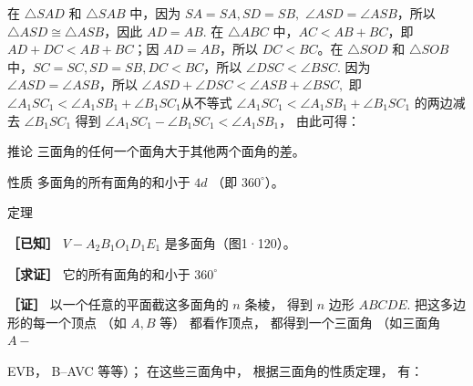 在 \(\triangle SAD\) 和 \(\triangle SAB\) 中，因为 \(SA = SA, SD = SB,\)
\(\angle ASD = \angle ASB\)，所以
\(\triangle ASD \cong \triangle ASB\)，因此 \(AD = AB.\) 在
\(\triangle ABC\) 中，\(AC < AB + BC\)，即 \(AD + DC < AB + BC\)；因
\(AD = AB\)，所以 \(DC < BC\)。在 \(\triangle SOD\) 和 \(\triangle SOB\)
中，\(SC = SC, SD = SB, DC < BC\)，所以 \(\angle DSC < \angle BSC.\)
因为 \(\angle ASD = \angle ASB\)，所以
\(\angle ASD + \angle DSC < \angle ASB + \angle BSC,\) 即
\(\angle A_{1}SC_{1} < \angle A_{1}SB_{1} + \angle B_{1}SC_{1}\)从不等式
\(\angle A_{1}SC_{1} < \angle A_{1}SB_{1} + \angle B_{1}SC_{1}\)
的两边减去 \(\angle B_{1}SC_{1}\) 得到
\(\angle A_{1}SC_{1} - \angle B_{1}SC_{1} < \angle A_{1}SB_{1}\)，
由此可得：

推论 三面角的任何一个面角大于其他两个面角的差。

性质 多面角的所有面角的和小于 \(4d\) （即 \(360^{\circ}\)）。

定理

\textbf{［已知］} \(V - A_{2}B_{1}O_{1}D_{1}E_{1}\)
是多面角（图1·120）。

\textbf{［求证］} 它的所有面角的和小于 \(360^{\circ}\)

\textbf{［证］} 以一个任意的平面截这多面角的 \(n\) 条棱， 得到 \(n\)
边形 \(ABCDE\). 把这多边形的每一个顶点 （如 \(A, B\) 等） 都看作顶点，
都得到一个三面角 （如三面角 \(A-\)

EVB， B--AVC 等等）； 在这些三面角中， 根据三面角的性质定理， 有：

